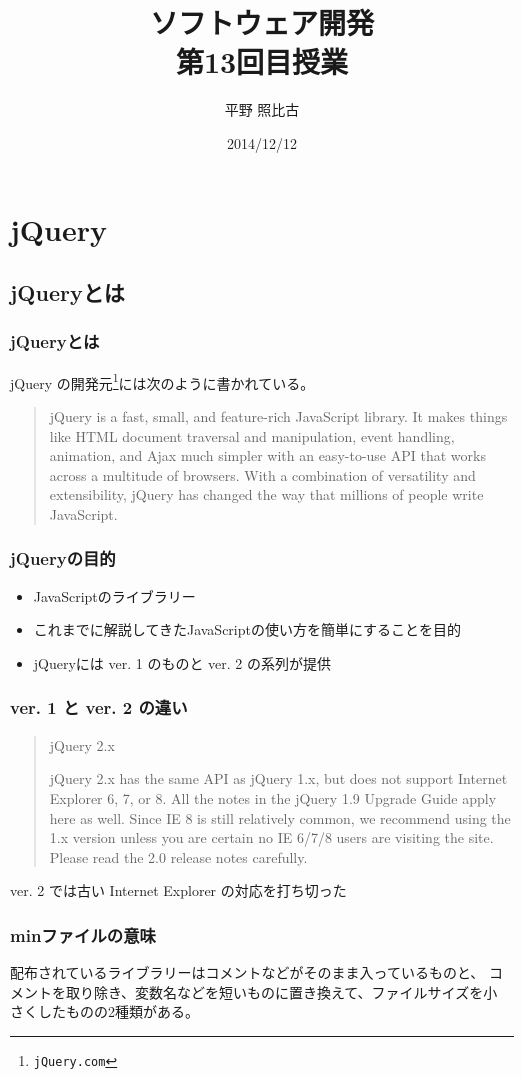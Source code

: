 \documentclass[dvipsk]{beamer}
\title{ソフトウェア開発\\第13回目授業}
\author{平野 照比古}
\institute{}
\date{2014/12/12}
\begin{document}
\frame{\maketitle}
\section{jQuery}
\subsection{jQueryとは}
\begin{frame}[containsverbatim]
\frametitle{jQueryとは}
jQuery の開発元\footnote{\texttt{jQuery.com}}には次のように書かれている。
\begin{quotation}
jQuery is a fast, small, and feature-rich JavaScript library. It makes
 things like HTML document traversal and manipulation, event handling,
 animation, and Ajax much simpler with an easy-to-use API that works
 across a multitude of browsers. With a combination of versatility and
 extensibility, jQuery has changed the way that millions of people write
 JavaScript.
\end{quotation}
\end{frame}
\begin{frame}[containsverbatim]
\frametitle{jQueryの目的}
\begin{itemize}
 \item JavaScriptのライブラリー
 \item これまでに解説してきたJavaScriptの使い方を簡単にすることを目的
 \item jQueryには ver. 1 のものと ver. 2 の系列が提供
\end{itemize}
\end{frame}
\begin{frame}[containsverbatim]
\frametitle{ver. 1 と ver. 2 の違い}
\begin{quotation}
jQuery 2.x

jQuery 2.x has the same API as jQuery 1.x, but does not support Internet
Explorer 6, 7, or 8. All the notes in the jQuery 1.9 Upgrade Guide apply
here as well. Since IE 8 is still relatively common, we recommend using
the 1.x version unless you are certain no IE 6/7/8 users are visiting
the site. Please read the 2.0 release notes carefully. 
\end{quotation}
 ver. 2 では古い Internet Explorer の対応を打ち切った
\end{frame}
\begin{frame}[containsverbatim]
\frametitle{minファイルの意味}
配布されているライブラリーはコメントなどがそのまま入っているものと、
コメントを取り除き、変数名などを短いものに置き換えて、ファイルサイズを小
さくしたものの2種類がある。
\end{frame}
\newcommand{\FuncRef}[1]{%
\refstepcounter{Func}\label{#1}({\bfseries 機能\arabic{Func}})}
\end{document}
